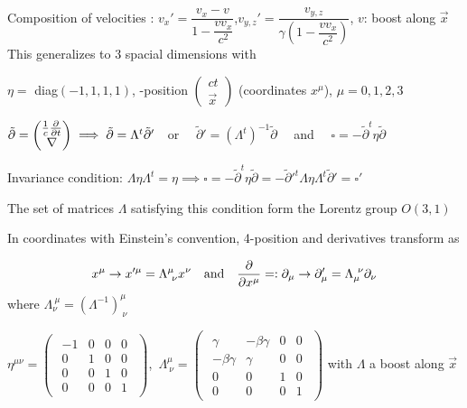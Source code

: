 \item Composition of velocities : %
$v_x' = \dfrac{v_x - v}{1 - \dfrac{v v_x}{c^2}}$,\quad $v_{y,z}' = \dfrac{v_{y,z}}{\gamma(1 - \dfrac{v v_x}{c^2})}$, $v$: boost along $\vec{x}$
\squishend
{}
This generalizes to 3 spacial dimensions with
\squishlist
\item $\eta =$ diag$(-1,1,1,1)$, -position $ \begin{pmatrix}
    ct\\
\vec{x}
\end{pmatrix}$ (coordinates $x^{\mu}$), $\mu = 0,1,2,3 $
\item 
$\tilde\partial = \begin{pmatrix}
    \frac{1}{c}\frac{\partial }{\partial t} \\
    \nabla 
\end{pmatrix}
\implies \tilde\partial = \Lambda^t\tilde\partial' \quad $or $ \quad \tilde\partial' = (\Lambda^t)^{-1}\tilde\partial \quad $ and $ \quad  \square =-\tilde\partial^t\eta\tilde\partial$

\item Invariance condition: $\Lambda\eta\Lambda^t= \eta \implies \square =-\tilde\partial^t\eta\tilde\partial =-\tilde\partial'^t\Lambda\eta\Lambda^t\tilde\partial'= \square' $ 
\item The set of matrices $\Lambda$ satisfying this condition form the Lorentz group $O(3,1)$

\item In coordinates with Einstein's convention, 4-position and derivatives transform as

$$x^\mu \rightarrow x'^{\mu} = \Lambda^{\mu}_{\ \nu} x^{\nu} \quad \text{and} \quad 
 \pad{}{x^\mu}=: \partial_\mu \rightarrow \partial_\mu' = \Lambda_\mu^{\ \nu}\partial_\nu
$$
where $\Lambda_\nu^{\ \mu}= (\Lambda^{-1})^\mu_{\ \nu} $

\item $\eta^{\mu\nu}=
\begin{pmatrix}
\begin{array}{cccc}
-1 & 0 & 0 & 0 \\ 
0 & 1 & 0 & 0 \\ 
0 & 0 & 1 & 0 \\ 
0 & 0 & 0 & 1
\end{array} 
\end{pmatrix}$,\, $
\Lambda^\mu_{\ \nu}=
\begin{pmatrix}
\begin{array}{cccc}
\gamma & -\beta \gamma & 0 & 0 \\ 
-\beta \gamma & \gamma & 0 & 0 \\ 
0 & 0 & 1 & 0 \\ 
0 & 0 & 0 & 1
\end{array} 
\end{pmatrix}$
with $\Lambda$ a boost along $\vec{x}$


